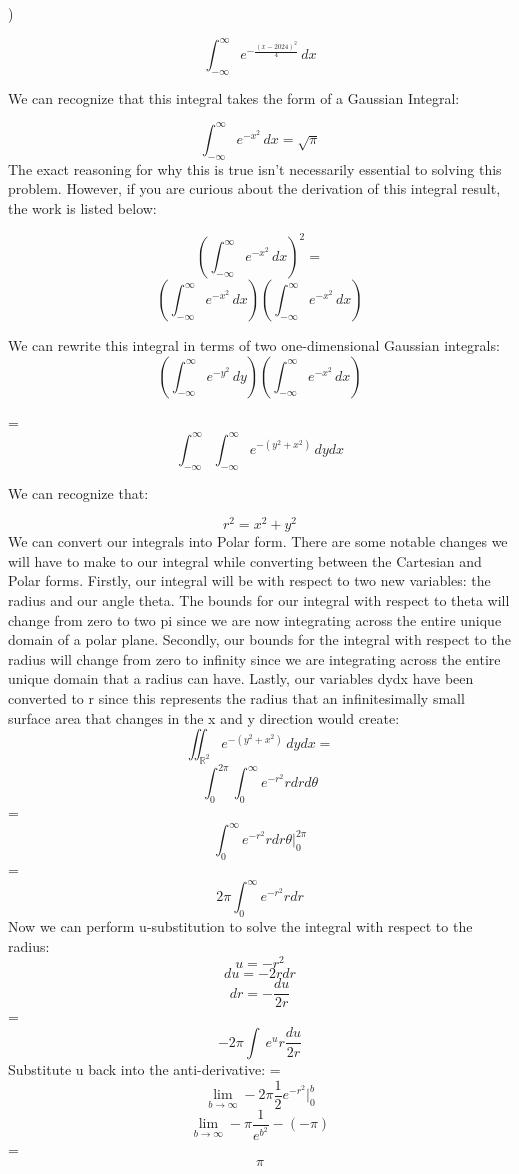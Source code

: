 \documentclass{article}
\begin{document}
)
\begin{flushleft}
\[\int_{-\infty}^{\infty} e^{-\frac{(x-2024)^2}{4}}\, dx\]

We can recognize that this integral takes the form of a Gaussian Integral:

\[\int_{-\infty}^{\infty} e^{-x^2}\,dx = \sqrt{\pi} \]
The exact reasoning for why this is true isn't necessarily essential to solving this problem. However, if you are curious about the derivation of this integral result, the work is listed below:

\[(\int_{-\infty}^{\infty} e^{-x^2}\,dx)^2 = \]
\[(\int_{-\infty}^{\infty} e^{-x^2}\,dx)(\int_{-\infty}^{\infty} e^{-x^2}\,dx)\]

\noindent We can rewrite this integral in terms of two one-dimensional Gaussian integrals:
\[(\int_{-\infty}^{\infty} e^{-y^2}\,dy)(\int_{-\infty}^{\infty} e^{-x^2}\,dx)\]

= \[ \int_{-\infty}^{\infty} \int_{-\infty}^{\infty} e^{-(y^2+x^2)}\,dydx\]

\noindent We can recognize that:

\[r^2 = x^2+y^2\]
We can convert our integrals into Polar form. There are some notable changes we will have to make to our integral while converting between the Cartesian and Polar forms. Firstly, our integral will be with respect to two new variables: the radius and our angle theta. The bounds for our integral with respect to theta will change from zero to two pi since we are now integrating across the entire unique domain of a polar plane. Secondly, our bounds for the integral with respect to the radius will change from zero to infinity since we are integrating across the entire unique domain that a radius can have. Lastly, our variables dydx have been converted to r since this represents the radius that an infinitesimally small surface area that changes in the x and y direction would create:
\[\iint_{\mathbb{R}^2} e^{-(y^2+x^2)}\,dydx = \] \[
\int_{0}^{2\pi}\int_{0}^{\infty} e^{-r^2}rdrd \theta \]
= \[\int_{0}^{\infty} e^{-r^2}rdr \theta \Big|_{0}^{2\pi}\]
= \[2\pi \int_{0}^{\infty} e^{-r^2}rdr\]
Now we can perform u-substitution to solve the integral with respect to the radius:
\[u = -r^2\]
\[du = -2rdr\]
\[dr = - \frac{du}{2r}\]
= \[-2\pi \int\ e^{u}r \frac{du}{2r}\]
Substitute u back into the anti-derivative:
=\[\lim_{b\to\infty}-2\pi \frac{1}{2} e^{-r^2} \Big|_{0}^{b} \]
\[\lim_{b\to\infty}-\pi \frac{1}{e^{b^2}} - (-\pi)\]
= \[\pi\]


\end{flushleft}
\end{document}
